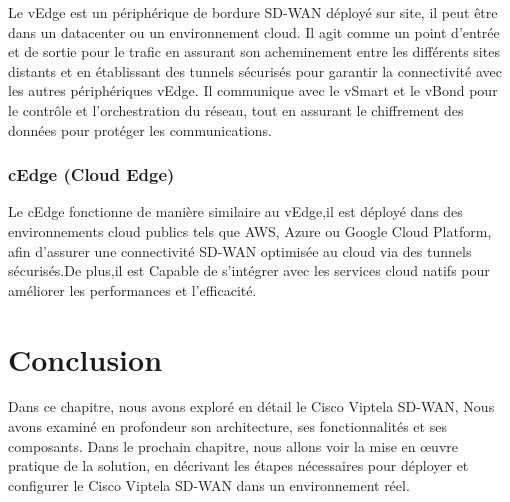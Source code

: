 Le vEdge est un périphérique de bordure SD-WAN déployé sur site, il peut être  dans un datacenter ou un environnement cloud. Il agit comme un point d'entrée et de sortie pour le trafic en  assurant son acheminement entre les différents sites distants et en  établissant des tunnels sécurisés pour garantir la connectivité avec les autres périphériques vEdge. Il communique avec le vSmart et le vBond pour le contrôle et l'orchestration du réseau, tout en assurant le chiffrement des données pour protéger les communications.

\subsubsection{  cEdge  (Cloud Edge) }


Le cEdge fonctionne de manière similaire au vEdge,il est déployé dans des environnements cloud publics tels que AWS, Azure ou Google Cloud Platform, afin d'assurer une connectivité SD-WAN optimisée au cloud via des tunnels sécurisés.De plus,il est Capable de s'intégrer avec les services cloud natifs pour améliorer les performances et l'efficacité.




\section*{Conclusion }

Dans ce chapitre, nous avons exploré en détail le Cisco Viptela SD-WAN, Nous avons examiné en profondeur son architecture, ses fonctionnalités et ses composants. Dans le prochain chapitre, nous allons voir  la mise en œuvre pratique de la solution, en décrivant les étapes nécessaires pour déployer et configurer le Cisco Viptela SD-WAN dans un environnement réel.

